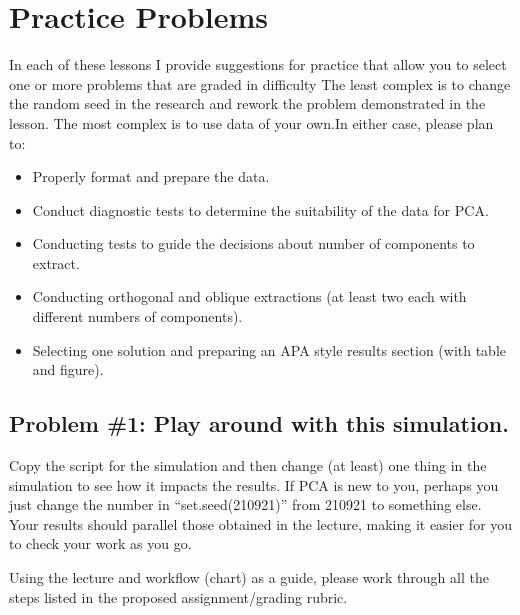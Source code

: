 \documentclass[
  english,
]{book}
\providecommand{\tightlist}{%
  \setlength{\itemsep}{0pt}\setlength{\parskip}{0pt}}
\begin{document}
\hypertarget{practice-problems-6}{%
\section{Practice Problems}\label{practice-problems-6}}

In each of these lessons I provide suggestions for practice that allow you to select one or more problems that are graded in difficulty The least complex is to change the random seed in the research and rework the problem demonstrated in the lesson. The most complex is to use data of your own.In either case, please plan to:

\begin{itemize}
\tightlist
\item
  Properly format and prepare the data.
\item
  Conduct diagnostic tests to determine the suitability of the data for PCA.
\item
  Conducting tests to guide the decisions about number of components to extract.
\item
  Conducting orthogonal and oblique extractions (at least two each with different numbers of components).
\item
  Selecting one solution and preparing an APA style results section (with table and figure).
\end{itemize}

\hypertarget{problem-1-play-around-with-this-simulation.-3}{%
\subsection{Problem \#1: Play around with this simulation.}\label{problem-1-play-around-with-this-simulation.-3}}

Copy the script for the simulation and then change (at least) one thing in the simulation to see how it impacts the results. If PCA is new to you, perhaps you just change the number in ``set.seed(210921)'' from 210921 to something else. Your results should parallel those obtained in the lecture, making it easier for you to check your work as you go.

Using the lecture and workflow (chart) as a guide, please work through all the steps listed in the proposed assignment/grading rubric.
\end{document}
